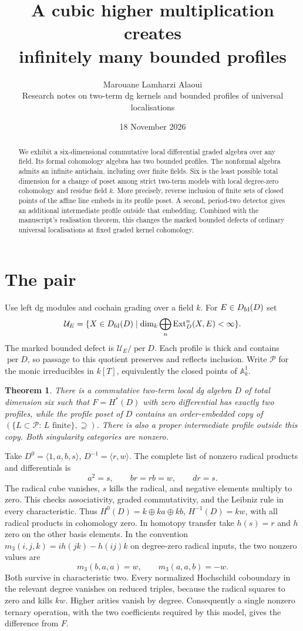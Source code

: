 \documentclass[11pt]{article}
\title{A cubic higher multiplication creates\\ infinitely many bounded profiles}
\author{Marouane Lamharzi Alaoui\\
\small Research notes on two-term dg kernels and bounded profiles of universal localisations}
\date{18 November 2026}
\newtheorem{thm}{Theorem}
\newcommand{\Dfd}{D_{\rm fd}}
\newcommand{\per}{\operatorname{per}}
\newcommand{\UU}{\mathcal U}
\newcommand{\Ext}{\operatorname{Ext}}
\begin{document}
\maketitle
\begin{abstract}
We exhibit a six-dimensional commutative local differential graded algebra
over any field. Its formal cohomology algebra has two bounded profiles.
The nonformal algebra admits an infinite antichain, including over finite
fields. Six is the least possible total dimension for a change of poset
among strict two-term models with local degree-zero cohomology and residue
field $k$. More precisely, reverse inclusion of finite sets of closed points
of the affine line embeds in its profile poset. A second, period-two
detector gives an additional intermediate profile outside that embedding.
Combined with the manuscript's realisation theorem, this changes the
marked bounded defects of ordinary universal localisations at fixed
graded kernel cohomology.
\end{abstract}

\section{The pair}
Use left dg modules and cochain grading over a field $k$. For
$E\in\Dfd(D)$ set
\[
 \UU_E=\{X\in\Dfd(D)\mid \dim_k\bigoplus_n\Ext_D^n(X,E)<\infty\}.
\]
The marked bounded defect is $\UU_E/\per D$. Each profile is thick and
contains $\per D$, so passage to this quotient preserves and reflects
inclusion. Write $\mathcal P$ for the monic irreducibles in $k[T]$,
equivalently the closed points of $\mathbb A^1_k$.

\begin{thm}\label{main}
There is a commutative two-term local dg algebra $D$ of total dimension
six such that $F=H^*(D)$ with zero differential has exactly two
profiles, while the profile poset of $D$ contains an order-embedded copy
of $(\{L\subset\mathcal P:\,L\text{ finite}\},\supseteq)$.
There is also a proper intermediate profile outside this copy.
Both singularity categories are nonzero.
\end{thm}

Take $D^0=\langle1,a,b,s\rangle$, $D^{-1}=\langle r,w\rangle$.
The complete list of nonzero radical products and differentials is
\[
             a^2=s,\qquad br=rb=w,\qquad dr=s .
\]
The radical cube vanishes, $s$ kills the radical, and negative elements
multiply to zero. This checks associativity, graded commutativity, and
the Leibniz rule in every characteristic. Thus $H^0(D)=k\oplus ka\oplus kb$,
$H^{-1}(D)=kw$, with all radical products in cohomology zero.
In homotopy transfer take $h(s)=r$ and $h$ zero on the other basis
elements. In the convention $m_3(i,j,k)=i h(jk)-h(ij)k$ on degree-zero
radical inputs, the two nonzero values are
\[
              m_3(b,a,a)=w,\qquad m_3(a,a,b)=-w .
\]
Both survive in characteristic two. Every normalized Hochschild coboundary
in the relevant degree vanishes on reduced triples, because the radical
squares to zero and kills $kw$. Higher arities vanish by degree.
Consequently a single nonzero ternary operation, with the two coefficients
required by this model, gives the difference from $F$.
\end{document}
